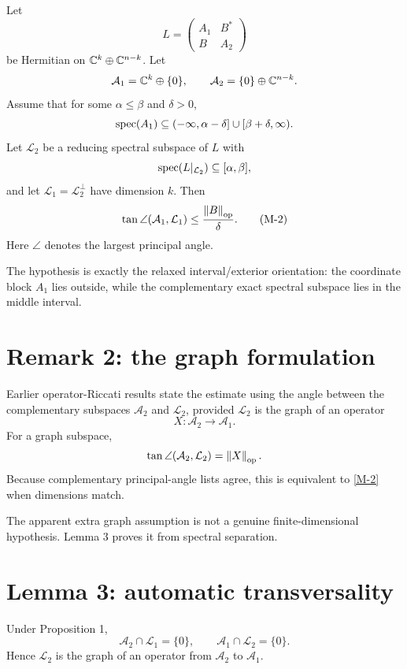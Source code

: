 Let
\[
  L=\begin{pmatrix}A_1&B^*\\B&A_2\end{pmatrix}
\]
be Hermitian on $\mathbb{C}^k\oplus\mathbb{C}^{n-k}$. Let
\[
  \mathcal A_1=\mathbb{C}^k\oplus\{0\},
  \qquad
  \mathcal A_2=\{0\}\oplus\mathbb{C}^{n-k}.
\]
Assume that for some $\alpha\le\beta$ and $\delta>0$,
\[
  \operatorname{spec}(A_1)
  \subseteq(-\infty,\alpha-\delta]
    \cup[\beta+\delta,\infty).
\]
Let $\mathcal L_2$ be a reducing spectral subspace of $L$ with
\[
  \operatorname{spec}(L|_{\mathcal L_2})\subseteq[\alpha,\beta],
\]
and let $\mathcal L_1=\mathcal L_2^\perp$ have dimension $k$. Then
\begin{equation}
  \tan\angle(\mathcal A_1,\mathcal L_1)
  \le\frac{\left\lVert B\right\rVert_{\mathrm{op}}}{\delta}.
  \tag{M-2}\label{M-2}
\end{equation}
Here $\angle$ denotes the largest principal angle.

The hypothesis is exactly the relaxed interval/exterior orientation: the coordinate block $A_1$ lies outside, while the complementary exact spectral subspace lies in the middle interval.

\section{Remark 2: the graph formulation}

Earlier operator-Riccati results state the estimate using the angle between the complementary subspaces $\mathcal A_2$ and $\mathcal L_2$, provided $\mathcal L_2$ is the graph of an operator
\[
  X:\mathcal A_2\to\mathcal A_1.
\]
For a graph subspace,
\[
  \tan\angle(\mathcal A_2,\mathcal L_2)=\left\lVert X\right\rVert_{\mathrm{op}}.
\]
Because complementary principal-angle lists agree, this is equivalent to \eqref{M-2} when dimensions match.

The apparent extra graph assumption is not a genuine finite-dimensional hypothesis. Lemma 3 proves it from spectral separation.

\section{Lemma 3: automatic transversality}


Under Proposition 1,
\begin{equation}
  \mathcal A_2\cap\mathcal L_1=\{0\},
  \qquad
  \mathcal A_1\cap\mathcal L_2=\{0\}.
  \tag{M-transverse}
\end{equation}
Hence $\mathcal L_2$ is the graph of an operator from $\mathcal A_2$ to $\mathcal A_1$.

